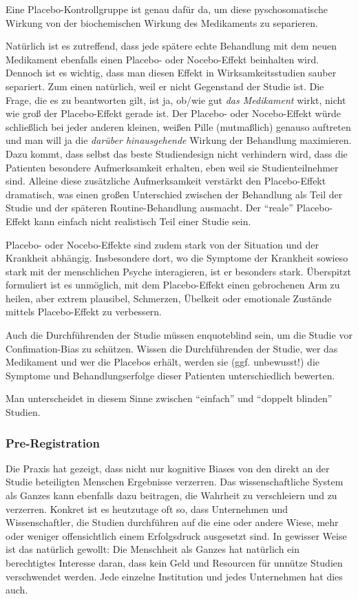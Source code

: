 Eine Placebo-Kontrollgruppe ist genau dafür da, um diese pyschosomatische Wirkung von der biochemischen Wirkung des Medikaments zu separieren.

Natürlich ist es zutreffend, dass jede spätere echte Behandlung mit dem neuen Medikament ebenfalls einen Placebo- oder Nocebo-Effekt beinhalten wird. Dennoch ist es wichtig, dass man diesen Effekt in Wirksamkeitsstudien sauber separiert. Zum einen natürlich, weil er nicht Gegenstand der Studie ist. Die Frage, die es zu beantworten gilt, ist ja, ob/wie gut \emph{das Medikament} wirkt, nicht wie groß der Placebo-Effekt gerade ist. Der Placebo- oder Nocebo-Effekt würde schließlich bei jeder anderen kleinen, weißen Pille (mutmaßlich) genauso auftreten und man will ja die \emph{darüber hinausgehende} Wirkung der Behandlung maximieren. Dazu kommt, dass selbst das beste Studiendesign nicht verhindern wird, dass die Patienten besondere Aufmerksamkeit erhalten, eben weil sie Studienteilnehmer sind. Alleine diese zusätzliche Aufmerksamkeit verstärkt den Placebo-Effekt dramatisch, was einen großen Unterschied zwischen der Behandlung als Teil der Studie und der späteren Routine-Behandlung ausmacht. Der \enquote{reale} Placebo-Effekt kann einfach nicht realistisch Teil einer Studie sein.

Placebo- oder Nocebo-Effekte sind zudem stark von der Situation und der Krankheit abhängig. Insbesondere dort, wo die Symptome der Krankheit sowieso stark mit der menschlichen Psyche interagieren, ist er besonders stark. Überspitzt formuliert ist es unmöglich, mit dem Placebo-Effekt einen gebrochenen Arm zu heilen, aber extrem plausibel, Schmerzen, Übelkeit oder emotionale Zustände mittels Placebo-Effekt zu verbessern.

\medskip
Auch die Durchführenden der Studie müssen enquote{blind} sein, um die Studie vor Confimation-Bias zu schützen. Wissen die Durchführenden der Studie, wer das Medikament und wer die Placebos erhält, werden sie (ggf. unbewusst!) die Symptome und Behandlungserfolge dieser Patienten unterschiedlich bewerten.

Man unterscheidet in diesem Sinne zwischen \enquote{einfach} und \enquote{doppelt blinden} Studien.

\subsubsection{Pre-Registration}

Die Praxis hat gezeigt, dass nicht nur kognitive Biases von den direkt an der Studie beteiligten Menschen Ergebnisse verzerren. Das wissenschaftliche System als Ganzes kann ebenfalls dazu beitragen, die Wahrheit zu verschleiern und zu verzerren. Konkret ist es heutzutage oft so, dass Unternehmen und Wissenschaftler, die Studien durchführen auf die eine oder andere Wiese, mehr oder weniger offensichtlich einem Erfolgsdruck ausgesetzt sind. In gewisser Weise ist das natürlich gewollt: Die Menschheit als Ganzes hat natürlich ein berechtigtes Interesse daran, dass kein Geld und Resourcen für unnütze Studien verschwendet werden. Jede einzelne Institution und jedes Unternehmen hat dies auch.

